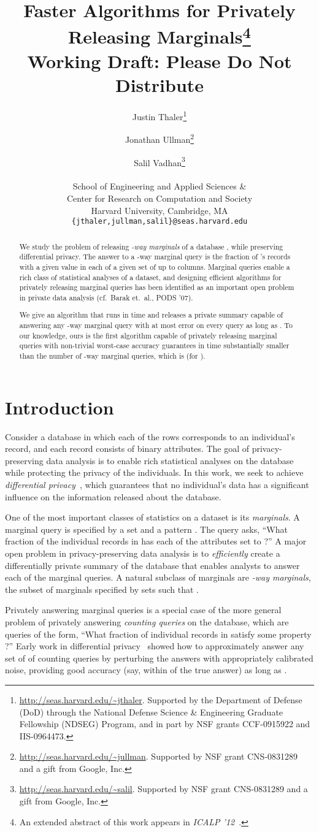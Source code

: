 \documentclass[11pt]{article}
\title{Faster Algorithms for Privately \\ Releasing Marginals\thanks{An extended abstract of this work appears in \emph{ICALP '12}~\cite{ThalerUlVa12}.} \ifnum\final=0 \\
{\small \sc Working Draft: Please Do Not Distribute}\fi}
\author{Justin Thaler\thanks{\url{http://seas.harvard.edu/\~jthaler}. Supported by the Department of Defense (DoD) through the National
Defense Science \& Engineering Graduate Fellowship (NDSEG) Program,
and in part by NSF grants CCF-0915922 and IIS-0964473.}
 \and Jonathan Ullman\thanks{
\url{http://seas.harvard.edu/\~jullman}.  Supported by NSF grant CNS-0831289 and a gift from Google, Inc.}
 \and Salil Vadhan\thanks{
\url{http://seas.harvard.edu/\~salil}.  Supported by NSF grant CNS-0831289 and a gift from Google, Inc.}
\\ \\ School of Engineering and Applied Sciences \&\\ Center for Research on Computation and Society\\ Harvard University, Cambridge, MA \\ \texttt{\{jthaler,jullman,salil\}@seas.harvard.edu}}
\theoremstyle{definition}
\begin{document}
\maketitle
\begin{abstract}
We study the problem of releasing \emph{-way marginals} of a database , while preserving differential privacy.  The answer to a -way marginal query is the fraction of 's records  with a given value in each of a given set of up to  columns.  Marginal queries enable a rich class of statistical analyses of a dataset, and designing efficient algorithms for privately releasing marginal queries has been identified as an important open problem in private data analysis (cf.~Barak et.~al., PODS '07).

We give an algorithm that runs in time  and releases a private summary capable of answering any -way marginal query with at most  error on every query as long as .  To our knowledge, ours is the first algorithm capable of privately releasing marginal queries with non-trivial worst-case accuracy guarantees in time substantially smaller than the number of -way marginal queries, which is  (for ).
\end{abstract}

\section{Introduction}
Consider a database  in which each of the  rows corresponds to an individual's record, and each record consists of  binary attributes.  The goal of privacy-preserving data analysis is to enable rich statistical analyses on the database while protecting the privacy of the individuals.  In this work, we seek to achieve \emph{differential privacy}~\cite{DworkMcNiSm06}, which guarantees that no individual's data has a significant influence on the information released about the database.

One of the most important classes of statistics on a dataset is its \emph{marginals}.  A marginal query is specified by a set  and a pattern . The query asks, ``What fraction of the individual records in  has each of the attributes  set to ?''  A major open problem in privacy-preserving data analysis is to \emph{efficiently} create a differentially private summary of the database that enables analysts to answer each of the  marginal queries.  A natural subclass of marginals are \emph{-way marginals}, the subset of marginals specified by sets  such that .

Privately answering marginal queries is a special case of the more general problem of privately answering \emph{counting queries} on the database, which are queries of the form, ``What fraction of individual records in  satisfy some property ?''  Early work in differential privacy~\cite{DinurNi03,BlumDwMcNi05,DworkMcNiSm06} showed how to approximately answer any set of of counting queries  by perturbing the answers with appropriately calibrated noise, providing good accuracy (say, within  of the true answer) as long as .
\end{document}
